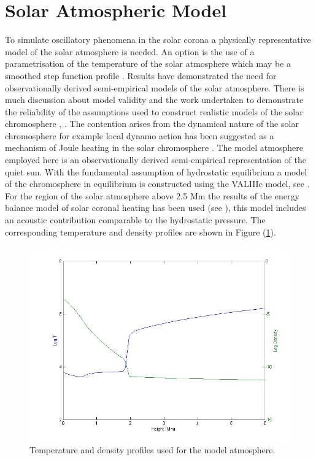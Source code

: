 \documentclass[authoryear,final,1p]{elsarticle}
\begin{document}
\section{Solar Atmospheric Model}
To simulate oscillatory phenomena in the solar corona a physically representative model of the solar atmosphere is needed. 
An option is the use of a parametrisation of the temperature of the solar atmosphere which may be a smoothed step 
function profile  \citet{Murawski2010}. Results have demonstrated the need for observationally derived semi-empirical 
models of the solar atmosphere. There is much discussion about model validity and the work undertaken to 
demonstrate the reliability of the assumptions used to construct realistic models of the solar chromosphere 
\citet{Carlsson1995}, \citet{Kalkofen2012}. The contention arises from the dynamical nature of the solar chromosphere for example local dynamo action has been suggested as a mechanism of Joule heating in the solar chromosphere \citet{Leenaarts2011}. The model atmosphere employed here is an observationally derived semi-empirical representation of the quiet sun. With the fundamental assumption of hydrostatic equilibrium a model of the chromosphere in equilibrium is constructed using the VALIIIc model, see \citet{Vernazza1981}. For the region of the solar atmosphere above 2.5 Mm the results of the energy balance model of solar coronal heating has been used (see \citet{McWhirter1975}), this model includes an acoustic contribution comparable to the hydrostatic pressure. The corresponding temperature and density profiles are shown in Figure (\ref{Fig1}).


\begin{figure}[h]
\includegraphics[scale=0.5]{images/VAL3C_rho_temp_fig2.jpg}
\caption{Temperature and density profiles used for the model atmosphere. }
\label{Fig1}
\end{figure}
\end{document}
